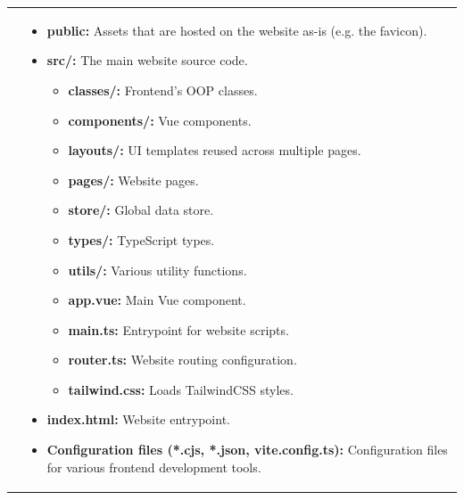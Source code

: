 \documentclass[notitlepage, 12pt]{report}
\begin{document}
\begin{xltabular}{\textwidth}{
		@{}
		p{0.3\textwidth}
		X
	}
	\centerline{}
	&
	\begin{itemize}[label={}, leftmargin=5pt]
		\item \textbf{public:} Assets that are hosted on the website as-is (e.g. the favicon).
		\item \textbf{src/:} The main website source code.
		      \begin{itemize}[label={}]
			      \item \textbf{classes/:} Frontend’s OOP classes.
			      \item \textbf{components/:} Vue components.
			      \item \textbf{layouts/:} UI templates reused across multiple pages.
			      \item \textbf{pages/:} Website pages.
			      \item \textbf{store/:} Global data store.
			      \item \textbf{types/:} TypeScript types.
			      \item \textbf{utils/:} Various utility functions.
			      \item \textbf{app.vue:} Main Vue component.
			      \item \textbf{main.ts:} Entrypoint for website scripts.
			      \item \textbf{router.ts:} Website routing configuration.
			      \item \textbf{tailwind.css:} Loads TailwindCSS styles.
		      \end{itemize}
		\item \textbf{index.html:} Website entrypoint.
		\item \textbf{Configuration files (*.cjs, *.json, vite.config.ts):} Configuration files for various frontend development tools.
	\end{itemize}
\end{xltabular}
\end{document}
